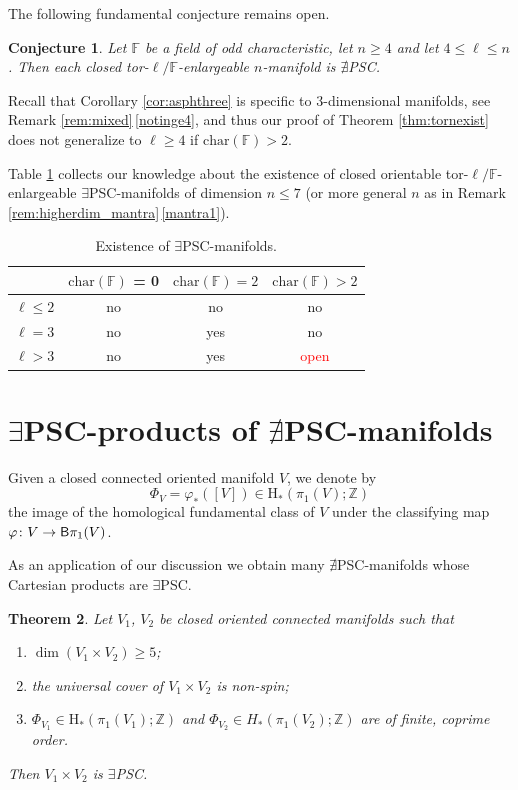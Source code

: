 \documentclass[pdftex]{sigma}
\numberwithin{equation}{section}
\newtheorem{Theorem}{Theorem}[section]
\newtheorem{Conjecture}[Theorem]{Conjecture}
 { \theoremstyle{definition}
\newtheorem{Definition}[Theorem]{Definition}
\newtheorem{Note}[Theorem]{Note}
\newtheorem{Example}[Theorem]{Example}
\newtheorem{Remark}[Theorem]{Remark}
}
\newcommand{\F}{\mathbb{F}}
\newcommand{\Z}{\mathbb{Z}}
\newcommand{\charac}{\mathrm{char}}
\newcommand{\sB}{{\sf B}}
\newcommand{\myicon}{$\,\,\,\triangleright$}
\newcommand{\no}{{\color{brown!70!black}$\nexists$}{\sf PSC}}
\newcommand{\yes}{{\color {blue!70!black}$\exists$}{\sf PSC}}
\newcommand{\Ho}{\mathrm{H}}
\begin{document}
The following fundamental conjecture remains open.

\begin{Conjecture} \label{main_conj}
Let $\F$ be a field of odd characteristic, let $n \geq 4$ and let $4 \leq \ell \leq n$.
Then each closed tor-$\ell/\mathbb F$-enlargeable $n$-manifold is \no.
\end{Conjecture}

Recall that Corollary \ref{cor:asphthree} is specific to $3$-dimensional manifolds, see Remark \ref{rem:mixed}\,\ref{notinge4}, and thus our proof of Theorem \ref{thm:tornexist} does not generalize to $\ell \geq 4$ if $\charac(\F) > 2$.

Table \ref{tab:conditions} collects our knowledge about the existence of closed orientable tor-$\ell / \F$-enlargeable \yes-manifolds of dimension $n \leq 7$ (or more general $n$ as in Remark \ref{rem:higherdim_mantra}\,\ref{mantra1}).

\begin{table}[h]\renewcommand{\arraystretch}{1.2}
\centering
\begin{tabular}{|c|c|c|c|}
\hline
 & $\charac(\F)$ = 0 & $\charac(\F) = 2$ & $\charac(\F) > 2$ \\
\hline
$\ell \leq 2$ & no & no & no \\
\hline
$\ell = 3$ & no & yes & no \\
\hline
$\ell > 3$ & no & yes & \textcolor{red}{open} \\
\hline
\end{tabular}

\caption{\label{tab:conditions}Existence of \yes-manifolds.}
\end{table}

\section[PSC-products]{\yes-products of \no-manifolds}

Given a closed connected oriented manifold $V$, we denote by
\[
 \Phi_{V} = \varphi_*([V]) \in \Ho_*( \pi_1(V);\Z)
\]
 the image of the homological fundamental class of $V$ under the classifying map $\varphi \colon V \to \sB \pi_1(V)$.


As an application of our discussion we obtain many \no-manifolds whose Cartesian products are \yes.

\begin{Theorem}\label{thm:plenty}
Let $V_1$, $V_2$ be closed oriented connected manifolds such that
\begin{enumerate}[\myicon]\itemsep=0pt
 \item $\dim (V_1 \times V_2) \geq 5$;
 \item the universal cover of $V_1 \times V_2$ is non-spin;
 \item $\Phi_{V_1} \in \Ho_*(\pi_1(V_1) ; \Z)$ and $\Phi_{V_2} \in H_*(\pi_1(V_2); \Z)$ are of finite, coprime order.
\end{enumerate}
Then $V_1 \times V_2$ is \yes.
\end{Theorem}
\end{document}
